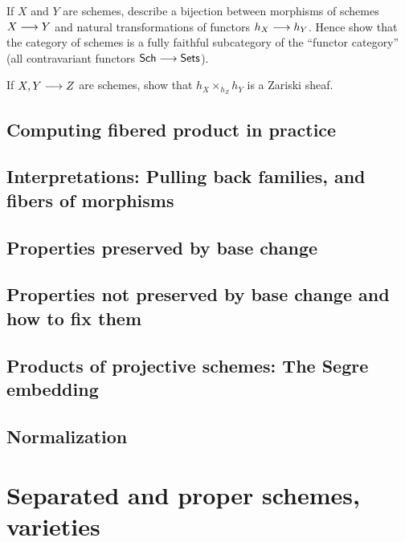 \documentclass[11pt]{book} %
\begin{document}
\begin{exr}
If $X$ and $Y$ are schemes, describe a bijection between morphisms of schemes $X\longrightarrow Y$ and natural transformations of functors $h_X\longrightarrow h_Y$. Hence show that the category of schemes is a fully faithful subcategory of the ``functor category'' (all contravariant functors $\mathsf{Sch}\longrightarrow\mathsf{Sets}$).
\end{exr}
\begin{exr}
If $X,Y\longrightarrow Z$ are schemes, show that $h_X\times_{h_Z} h_Y$ is a Zariski sheaf.
\end{exr}

\section{Computing fibered product in practice}
\section{Interpretations: Pulling back families, and fibers of morphisms}
\section{Properties preserved by base change}
\section{Properties not preserved by base change and how to fix them}
\section{Products of projective schemes: The Segre embedding}
\section{Normalization}
\chapter{Separated and proper schemes, varieties}
\end{document}
